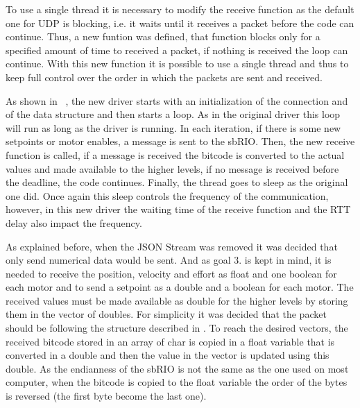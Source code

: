 To use a single thread it is necessary to modify the receive function as the default one for UDP is blocking, i.e. it waits until it receives a packet before the code can continue. Thus, a new funtion was defined, that function blocks only for a specified amount of time to received a packet, if nothing is received the loop can continue. With this new function it is possible to use a single thread and thus to keep full control over the order in which the packets are sent and received.

As shown in ~, the new driver starts with an initialization of the connection and of the data structure and then starts a loop. As in the original driver this loop will run as long as the driver is running. In each iteration, if there is some new setpoints or motor enables, a message is sent to the sbRIO. Then, the new receive function is called, if a message is received the bitcode is converted to the actual values and made available to the higher levels, if no message is received before the deadline, the code continues. Finally, the thread goes to sleep as the original one did. Once again this sleep controls the frequency of the communication, however, in this new driver the waiting time of the receive function and the \gls{RTT} delay also impact the frequency. 

 As explained before, when the \gls{JSON} Stream was removed it was decided that only send numerical data would be sent. And as goal 3. is kept in mind, it is needed to receive the position, velocity and effort as float and one boolean for each motor and to send a setpoint as a double and a boolean for each motor. The received values must be made available as double for the higher levels by storing them in the vector of doubles. For simplicity it was decided that the packet should be following the structure described in . To reach the desired vectors, the received bitcode stored in an array of char is copied in a float variable that is converted in a double and then the value in the vector is updated using this double. As the endianness of the sbRIO is not the same as the one used on most computer, when the bitcode is copied to the float variable the order of the bytes is reversed (the first byte become the last one).

